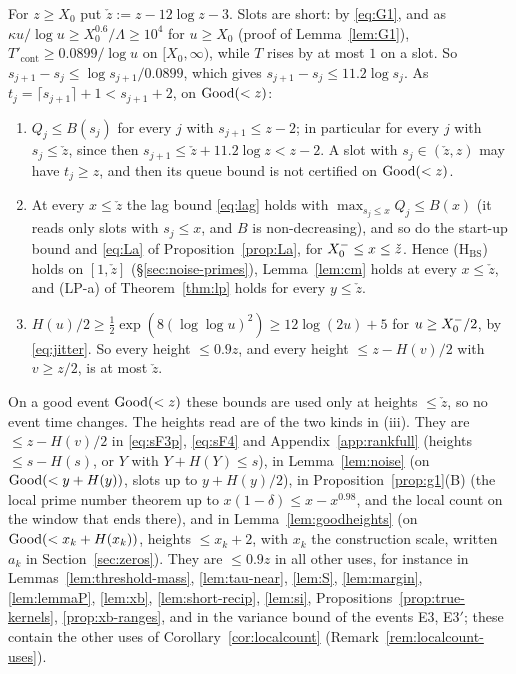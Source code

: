\begin{remark}\label{rem:horizon}
For $z\ge X_0$ put $\check z:=z-12\log z-3$. Slots are short: by \eqref{eq:G1}, and as $\kappa u/\log u\ge X_0^{0.6}/\Lambda\ge10^4$
for $u\ge X_0$ (proof of Lemma~\ref{lem:G1}), $T'_{\mathrm{cont}}\ge0.0899/\log u$ on $[X_0,\infty)$, while $T$ rises by at most $1$
on a slot. So $s_{j+1}-s_j\le\log s_{j+1}/0.0899$, which gives $s_{j+1}-s_j\le11.2\log s_j$. As $t_j=\lceil s_{j+1}\rceil+1<s_{j+1}+2$,
on $\mathrm{Good}(<z)$:
\begin{enumerate}[label=\textup{(\roman*)}]
\item $Q_j\le B(s_j)$ for every $j$ with $s_{j+1}\le z-2$; in particular for every $j$ with $s_j\le\check z$, since then
  $s_{j+1}\le\check z+11.2\log z<z-2$. A slot with $s_j\in(\check z,z)$ may have $t_j\ge z$, and then its queue bound is not
  certified on $\mathrm{Good}(<z)$.
\item At every $x\le\check z$ the lag bound \eqref{eq:lag} holds with $\max_{s_j\le x}Q_j\le B(x)$ (it reads only slots with
  $s_j\le x$, and $B$ is non-decreasing), and so do the start-up bound and \eqref{eq:La} of Proposition~\ref{prop:La}, for
  $X_0^{-}\le x\le\check z$. Hence \textup{(H$_{\mathrm{BS}}$)} holds on $[1,\check z]$ (\S\ref{sec:noise-primes}), Lemma~\ref{lem:cm} holds
  at every $x\le\check z$, and (LP-a) of Theorem~\ref{thm:lp} holds for every $y\le\check z$.
\item $H(u)/2\ge\frac12\exp(8(\log\log u)^2)\ge12\log(2u)+5$ for $u\ge X_0^{-}/2$, by \eqref{eq:jitter}. So every height $\le0.9z$, and
  every height $\le z-H(v)/2$ with $v\ge z/2$, is at most $\check z$.
\end{enumerate}
On a good event $\mathrm{Good}(<z)$ these bounds are used only at heights $\le\check z$, so no event time changes. The heights read are
of the two kinds in (iii). They are $\le z-H(v)/2$ in \ref{eq:sF3p}, \ref{eq:sF4} and Appendix~\ref{app:rankfull} (heights
$\le s-H(s)$, or $Y$ with $Y+H(Y)\le s$), in Lemma~\ref{lem:noise} (on $\mathrm{Good}(<y+H(y))$, slots up to $y+H(y)/2$), in Proposition~\ref{prop:g1}(B) (the local
prime number theorem up to $x(1-\delta)\le x-x^{0.98}$, and the local count on the window that ends there), and in
Lemma~\ref{lem:goodheights} (on $\mathrm{Good}(<x_k+H(x_k))$, heights $\le x_k+2$, with $x_k$ the construction scale, written $a_k$ in
Section~\ref{sec:zeros}). They are $\le0.9z$ in all other uses, for instance in Lemmas~\ref{lem:threshold-mass}, \ref{lem:tau-near}, \ref{lem:S},
\ref{lem:margin}, \ref{lem:lemmaP}, \ref{lem:xb}, \ref{lem:short-recip}, \ref{lem:si}, Propositions~\ref{prop:true-kernels},
\ref{prop:xb-ranges}, and in the variance bound of the events E3, E3$'$; these contain the other uses of
Corollary~\ref{cor:localcount} (Remark~\ref{rem:localcount-uses}).
\end{remark}

